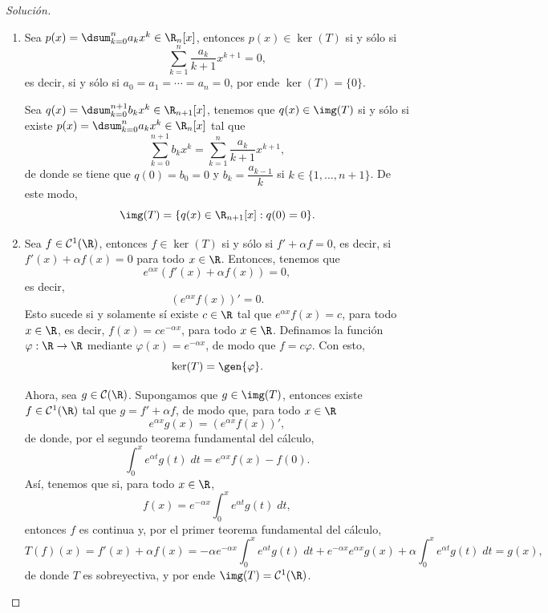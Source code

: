 \documentclass[a4,11pt]{aleph-notas}
\begin{document}
\begin{proof}[Solución]
\begin{enumerate}
    \item Sea $p(x) = \dsum_{k=0}^n a_k x^k\in \R_n[x]$, entonces $p(x)\in \ker(T)$ si y sólo si
    \[
        \sum_{k=1}^n \frac{a_k}{k+1}x^{k+1} = 0,
    \]
    es decir, si y sólo si $a_0 = a_1 = \cdots = a_n = 0$, por ende $\ker(T) = \{0\}$. 
    
    Sea $q(x) = \dsum_{k=0}^{n+1} b_k x^k\in \R_{n+1}[x]$, tenemos que $q(x)\in\img(T)$ si y sólo si existe $p(x) = \dsum_{k=0}^n a_k x^k\in \R_n[x]$ tal que
    \[
        \sum_{k=0}^{n+1} b_k x^k = \sum_{k=1}^n \frac{a_k}{k+1}x^{k+1},
    \]
    de donde se tiene que $q(0) = b_0 = 0$ y $b_k = \dfrac{a_{k-1}}{k}$ si $k\in\{1,\dots,n+1\}$. De este modo,
    \[
        \img(T) = \{q(x)\in \R_{n+1}[x] : q(0) = 0\}.
    \]
    
    \item Sea $f\in\mathcal{C}^1(\R)$, entonces $f\in\ker(T)$ si y sólo si $f'+\alpha f = 0$, es decir, si $f'(x) + \alpha f(x) = 0$ para todo $x\in \R$. Entonces, tenemos que
    \[
        e^{\alpha x}(f'(x) + \alpha f(x)) = 0,
    \]
    es decir,
    \[
        (e^{\alpha x}f(x)) ' = 0.
    \]
    Esto sucede si y solamente sí existe $c\in\R$ tal que $e^{\alpha x}f(x) = c$, para todo $x\in\R$, es decir, $f(x) = ce^{-\alpha x}$, para todo $x\in\R$. Definamos la función $\varphi:\R\to\R$ mediante $\varphi(x) = e^{-\alpha x}$, de modo que $f=c\varphi$. Con esto,
    \[
        \ker(T) = \gen\{\varphi\}.
    \]
    
    Ahora, sea $g\in\mathcal{C}(\R)$. Supongamos que $g\in\img(T)$, entonces existe $f\in\mathcal{C}^1(\R)$ tal que $g = f' + \alpha f$, de modo que, para todo $x\in\R$
    \[
        e^{\alpha x}g(x) = (e^{\alpha x}f(x))',
    \]
    de donde, por el segundo teorema fundamental del cálculo,
    \[
        \int_0^x e^{\alpha t}g(t) \; dt = e^{\alpha x}f(x) - f(0).
    \]
    Así, tenemos que si, para todo $x\in\R$,
    \[
        f(x) = e^{-\alpha x}\int_0^x e^{\alpha t}g(t) \; dt,
    \]
    entonces $f$ es continua y, por el primer teorema fundamental del cálculo,
    \[
        T(f)(x) = f'(x) + \alpha f(x) = -\alpha e^{-\alpha x}\int_0^x e^{\alpha t}g(t) \; dt + e^{-\alpha x} e^{\alpha x}g(x) + \alpha \int_0^x e^{\alpha t}g(t) \; dt = g(x),
    \]
    de donde $T$ es sobreyectiva, y por ende $\img(T)=\mathcal{C}^{1}(\R)$.
\end{enumerate}
\end{proof}
\end{document}
